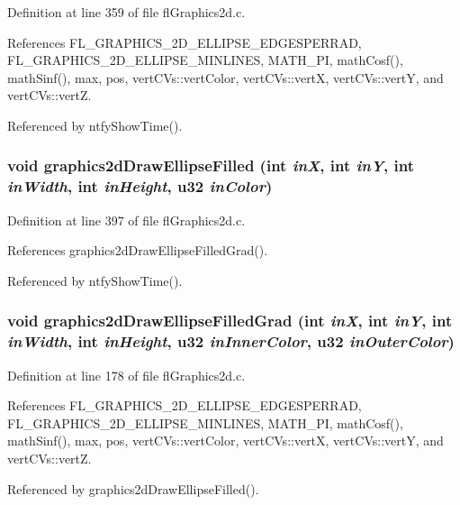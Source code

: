 Definition at line 359 of file fl\-Graphics2d.c.

References FL\_\-GRAPHICS\_\-2D\_\-ELLIPSE\_\-EDGESPERRAD, FL\_\-GRAPHICS\_\-2D\_\-ELLIPSE\_\-MINLINES, MATH\_\-PI, math\-Cosf(), math\-Sinf(), max, pos, vert\-CVs::vert\-Color, vert\-CVs::vert\-X, vert\-CVs::vert\-Y, and vert\-CVs::vert\-Z.

Referenced by ntfy\-Show\-Time().
\subsubsection{\setlength{\rightskip}{0pt plus 5cm}void graphics2d\-Draw\-Ellipse\-Filled (int {\em in\-X}, int {\em in\-Y}, int {\em in\-Width}, int {\em in\-Height}, u32 {\em in\-Color})}\label{flGraphics2d_8c_29b5a0adce9404448962b19aac6b2bc3}




Definition at line 397 of file fl\-Graphics2d.c.

References graphics2d\-Draw\-Ellipse\-Filled\-Grad().

Referenced by ntfy\-Show\-Time().
\subsubsection{\setlength{\rightskip}{0pt plus 5cm}void graphics2d\-Draw\-Ellipse\-Filled\-Grad (int {\em in\-X}, int {\em in\-Y}, int {\em in\-Width}, int {\em in\-Height}, u32 {\em in\-Inner\-Color}, u32 {\em in\-Outer\-Color})}\label{flGraphics2d_8c_2878c73198480cb1ec5413c4c6d3f0b2}




Definition at line 178 of file fl\-Graphics2d.c.

References FL\_\-GRAPHICS\_\-2D\_\-ELLIPSE\_\-EDGESPERRAD, FL\_\-GRAPHICS\_\-2D\_\-ELLIPSE\_\-MINLINES, MATH\_\-PI, math\-Cosf(), math\-Sinf(), max, pos, vert\-CVs::vert\-Color, vert\-CVs::vert\-X, vert\-CVs::vert\-Y, and vert\-CVs::vert\-Z.

Referenced by graphics2d\-Draw\-Ellipse\-Filled().
